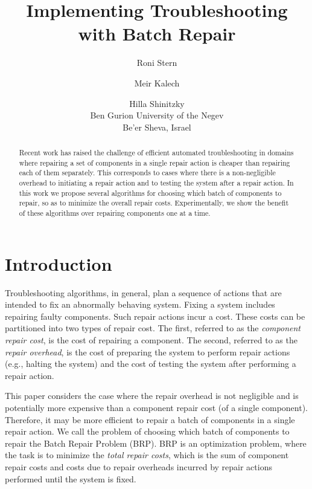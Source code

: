 \documentclass[letterpaper]{article}
\begin{document}
%
\title{Implementing Troubleshooting with Batch Repair}
\author{Roni Stern \and Meir Kalech \and Hilla Shinitzky \\
Ben Gurion University of the Negev\\
Be'er Sheva, Israel \\
}
\maketitle
\begin{abstract}
Recent work has raised the challenge of efficient automated troubleshooting in domains where repairing a set of components in a single repair action is cheaper than repairing each of them separately. This corresponds to cases where there is a non-negligible overhead to initiating a repair action and to testing the system after a repair action. In this work we propose several algorithms for choosing which batch of components to repair, so as to minimize the overall repair costs. Experimentally, we show the benefit of these algorithms over repairing components one at a time. %
\end{abstract}




\section{Introduction}
Troubleshooting algorithms, in general, plan a sequence of actions that are intended to fix an abnormally behaving system. Fixing a system includes repairing faulty components. Such repair actions incur a cost. These costs can be partitioned into two types of repair cost. The first, referred to as the {\em component repair cost}, is the cost of repairing a component. The second, referred to as the {\em repair overhead}, is the cost of preparing the system to perform repair actions (e.g., halting the system) and the cost of testing the system after performing a repair action.

This paper considers the case where the repair overhead is not negligible and is potentially more expensive than a component repair cost (of a single component). Therefore, it may be more efficient to repair a batch of components in a single repair action. We call the problem of choosing which batch of components to repair the Batch Repair Problem (BRP). BRP is an optimization problem, where the task is to minimize the {\em total repair costs}, which is the sum of component repair costs and costs due to repair overheads incurred by repair actions performed until the system is fixed.
\end{document}
